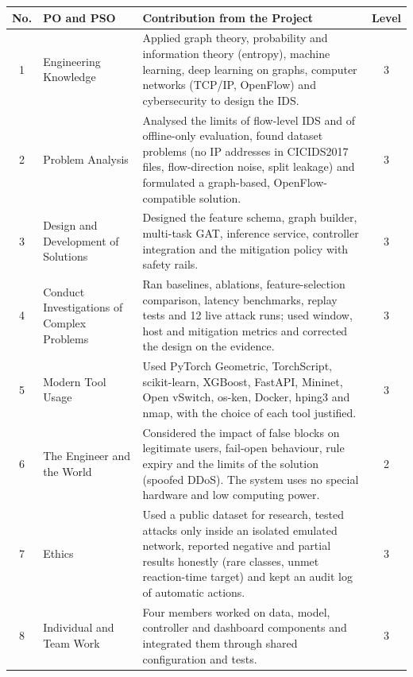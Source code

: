 \begin{appendices}
\begin{longtable}{|c|p{5.2cm}|p{7cm}|c|}
	\hline
	\textbf{No.} & \textbf{PO and PSO} & \textbf{Contribution from the Project} & \textbf{Level} \\
	\hline
	\endhead

	1 &
	Engineering Knowledge &
	Applied graph theory, probability and information theory (entropy), machine learning, deep learning on graphs, computer networks (TCP/IP, OpenFlow) and cybersecurity to design the IDS. &
	3 \\ \hline

	2 &
	Problem Analysis &
	Analysed the limits of flow-level IDS and of offline-only evaluation, found dataset problems (no IP addresses in CICIDS2017 files, flow-direction noise, split leakage) and formulated a graph-based, OpenFlow-compatible solution. &
	3 \\ \hline

	3 &
	Design and Development of Solutions &
	Designed the feature schema, graph builder, multi-task GAT, inference service, controller integration and the mitigation policy with safety rails. &
	3 \\ \hline

	4 &
	Conduct Investigations of Complex Problems &
	Ran baselines, ablations, feature-selection comparison, latency benchmarks, replay tests and 12 live attack runs; used window, host and mitigation metrics and corrected the design on the evidence. &
	3 \\ \hline

	5 &
	Modern Tool Usage &
	Used PyTorch Geometric, TorchScript, scikit-learn, XGBoost, FastAPI, Mininet, Open vSwitch, os-ken, Docker, hping3 and nmap, with the choice of each tool justified. &
	3 \\ \hline

	6 &
	The Engineer and the World &
	Considered the impact of false blocks on legitimate users, fail-open behaviour, rule expiry and the limits of the solution (spoofed DDoS). The system uses no special hardware and low computing power. &
	2 \\ \hline

	7 &
	Ethics &
	Used a public dataset for research, tested attacks only inside an isolated emulated network, reported negative and partial results honestly (rare classes, unmet reaction-time target) and kept an audit log of automatic actions. &
	3 \\ \hline

	8 &
	Individual and Team Work &
	Four members worked on data, model, controller and dashboard components and integrated them through shared configuration and tests. &
	3 \\ \hline


\end{longtable}
\end{appendices}

